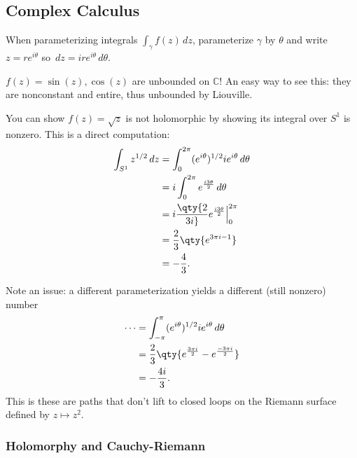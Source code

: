\hypertarget{complex-calculus}{%
\subsection{Complex Calculus}\label{complex-calculus}}

\begin{remark}

When parameterizing integrals \(\int_\gamma f(z)\,dz\), parameterize
\(\gamma\) by \(\theta\) and write \(z=re^{i\theta}\) so
\(\,dz= ire^{i\theta}\,d\theta\).

\end{remark}

\begin{warnings}

\(f(z) = \sin(z), \cos(z)\) are unbounded on \({\mathbb{C}}\)! An easy
way to see this: they are nonconstant and entire, thus unbounded by
Liouville.

\end{warnings}

\begin{example}[?]

You can show \(f(z) = \sqrt{z}\) is not holomorphic by showing its
integral over \(S^1\) is nonzero. This is a direct computation:
\begin{align*}
\int_{S^1} z^{1/2} \,dz
&= \int_0^{2\pi} (e^{i\theta})^{1/2} ie^{i\theta} \,d\theta\\
&= i \int_0^{2\pi} e^{i3\theta \over 2}\,d\theta\\
&= i \qty{2\over 3i} e^{i3\theta \over 2}\Big|_{0}^{2\pi} \\
&= {2\over 3}\qty{e^{3\pi i - 1}} \\
&= -{4\over 3}
.\end{align*}

Note an issue: a different parameterization yields a different (still
nonzero) number
\begin{align*}
\cdots 
&= \int_{-\pi}^{\pi} (e^{i\theta})^{1/2} ie^{i\theta} \,d\theta\\
&= {2\over 3}\qty{ e^{3\pi i \over 2} - e^{-3\pi i \over 2}} \\
&= -{4i\over 3}
.\end{align*}
This is these are paths that don't lift to closed loops on the Riemann
surface defined by \(z\mapsto z^2\).

\end{example}

\hypertarget{holomorphy-and-cauchy-riemann}{%
\subsubsection{Holomorphy and
Cauchy-Riemann}\label{holomorphy-and-cauchy-riemann}}

